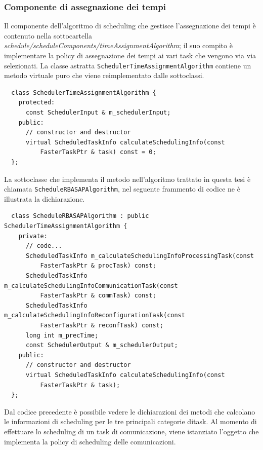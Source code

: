 \subsubsection{Componente di assegnazione dei tempi}
Il componente dell'algoritmo di scheduling che gestisce l'assegnazione dei 
tempi è contenuto nella sottocartella 
\emph{schedule/scheduleComponents/timeAssignmentAlgorithm}; il suo compito è 
implementare la policy di assegnazione dei tempi ai vari task che vengono via 
via selezionati. La classe astratta \verb+SchedulerTimeAssignmentAlgorithm+ 
contiene un metodo virtuale puro che viene reimplementato dalle sottoclassi.
\newline
\begin{verbatim}
  class SchedulerTimeAssignmentAlgorithm {
    protected:
      const SchedulerInput & m_schedulerInput;
    public:
      // constructor and destructor
      virtual ScheduledTaskInfo calculateSchedulingInfo(const 
          FasterTaskPtr & task) const = 0;
  };
\end{verbatim}

La sottoclasse che implementa il metodo nell'algoritmo trattato in questa tesi 
è chiamata \verb+ScheduleRBASAPAlgorithm+, nel seguente frammento di codice ne 
è illustrata la dichiarazione.
\newline
\begin{verbatim}
  class ScheduleRBASAPAlgorithm : public SchedulerTimeAssignmentAlgorithm {
    private:
      // code...
      ScheduledTaskInfo m_calculateSchedulingInfoProcessingTask(const 
          FasterTaskPtr & procTask) const;
      ScheduledTaskInfo m_calculateSchedulingInfoCommunicationTask(const 
          FasterTaskPtr & commTask) const;
      ScheduledTaskInfo m_calculateSchedulingInfoReconfigurationTask(const 
          FasterTaskPtr & reconfTask) const;
      long int m_precTime;
      const SchedulerOutput & m_schedulerOutput;
    public:
      // constructor and destructor
      virtual ScheduledTaskInfo calculateSchedulingInfo(const 
          FasterTaskPtr & task);
  };
\end{verbatim}
Dal codice precedente è possibile vedere le dichiarazioni dei metodi che 
calcolano le informazioni di scheduling per le tre principali categorie ditask. 
Al momento di effettuare lo scheduling di un task di comunicazione, viene 
istanziato l'oggetto che implementa la policy di scheduling delle comunicazioni.

